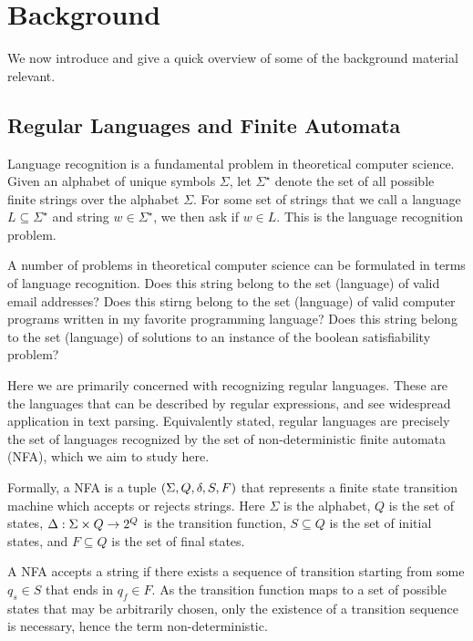 
\section{Background}

We now introduce and give a quick overview of some of the background
material relevant.


\subsection{Regular Languages and Finite Automata}

Language recognition is a fundamental problem in theoretical computer science.
Given an alphabet of unique symbols \(\Sigma\),
let \(\Sigma^\star\) denote the set of all possible finite strings over
the alphabet \(\Sigma\).
For some set of strings that we call a language \(L \subseteq \Sigma^\star\)
and string \(w \in \Sigma^\star\),
we then ask if \(w \in L\).
This is the language recognition problem.

A number of problems in theoretical computer science can be formulated
in terms of language recognition.
Does this string belong to the set (language) of valid email addresses?
Does this stirng belong to the set (language) of valid
computer programs written in my favorite programming language?
Does this string belong to the set (language) of solutions
to an instance of the boolean satisfiability problem?

Here we are primarily concerned with recognizing regular languages.
These are the languages that can be described by regular expressions,
and see widespread application in text parsing.
Equivalently stated, regular languages are precisely the set of languages
recognized by the set of non-deterministic finite automata (NFA),
which we aim to study here.

Formally, a NFA is a tuple
\(\left(\Sigma, Q, \delta, S, F\right)\)
that represents a finite state transition machine
which accepts or rejects strings.
Here \(\Sigma\) is the alphabet,
\(Q\) is the set of states,
\(\Delta : \Sigma \times Q \to 2^{Q}\) is the transition function,
\(S \subseteq Q\) is the set of initial states,
and \(F \subseteq Q\) is the set of final states.

A NFA accepts a string if there exists a sequence of transition
starting from some \(q_s \in S\)
that ends in \(q_f \in F\).
As the transition function maps to a set of possible states that may
be arbitrarily chosen,
only the existence of a transition sequence is necessary,
hence the term non-deterministic.

